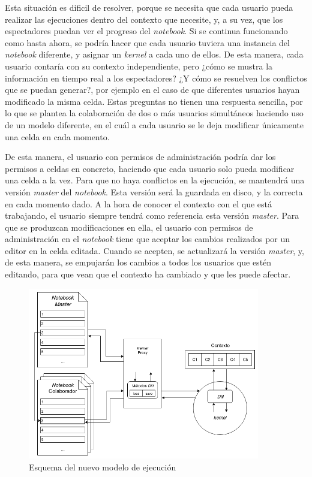 \documentclass[11pt,spanish,listoffigures]{tfgetsinf}
\begin{document}
Esta situación es dificil de resolver, porque se necesita que cada usuario pueda realizar las ejecuciones dentro del contexto que necesite, y, a su vez, que los espectadores puedan ver el progreso del \textit{notebook}. Si se continua funcionando como hasta ahora, se podría hacer que cada usuario tuviera una instancia del \textit{notebook} diferente, y asignar un \textit{kernel} a cada uno de ellos. De esta manera, cada usuario contaría con su contexto independiente, pero ¿cómo se mustra la información en tiempo real a los espectadores? ¿Y cómo se resuelven los conflictos que se puedan generar?, por ejemplo en el caso de que diferentes usuarios hayan modificado la misma celda. Estas preguntas no tienen una respuesta sencilla, por lo que se plantea la colaboración de dos o más usuarios simultáneos haciendo uso de un modelo diferente, en el cuál a cada usuario se le deja modificar únicamente una celda en cada momento.

De esta manera, el usuario con permisos de administración podría dar los permisos a celdas en concreto, haciendo que cada usuario solo pueda modificar una celda a la vez. Para que no haya conflictos en la ejecución, se mantendrá una versión \textit{master} del \textit{notebook}. Esta versión será la guardada en disco, y la correcta en cada momento dado. A la hora de conocer el contexto con el que está trabajando, el usuario siempre tendrá como referencia esta versión \textit{master}. Para que se produzcan modificaciones en ella, el usuario con permisos de administración en el \textit{notebook} tiene que aceptar los cambios realizados por un editor en la celda editada. Cuando se acepten, se actualizará la versión \textit{master}, y, de esta manera, se empujarán los cambios a todos los usuarios que estén editando, para que vean que el contexto ha cambiado y que les puede afectar.

\begin{figure}[H]
	\centering
  	\includegraphics[width=0.9\textwidth]{mejora_ejecucion.png}
  	\caption{Esquema del nuevo modelo de ejecución}
  	\label{fig:new-exec}
\end{figure}
\end{document}
